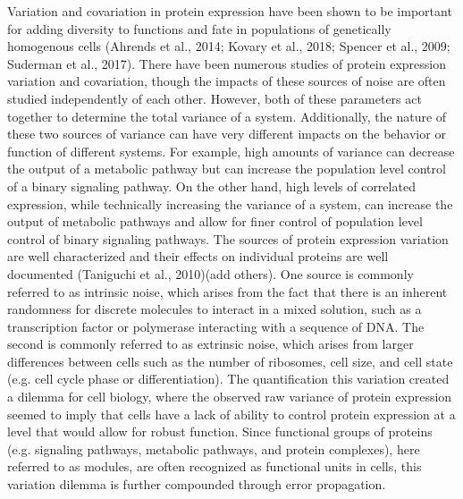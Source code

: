 Variation and covariation in protein expression have been shown to be important for adding diversity to functions and fate in populations of genetically homogenous cells (Ahrends et al., 2014; Kovary et al., 2018; Spencer et al., 2009; Suderman et al., 2017). There have been numerous studies of protein expression variation and covariation, though the impacts of these sources of noise are often studied independently of each other. However, both of these parameters act together to determine the total variance of a system. Additionally, the nature of these two sources of variance can have very different impacts on the behavior or function of different systems. For example, high amounts of variance can decrease the output of a metabolic pathway but can increase the population level control of a binary signaling pathway. On the other hand, high levels of correlated expression, while technically increasing the variance of a system, can increase the output of metabolic pathways and allow for finer control of population level control of binary signaling pathways. The sources of protein expression variation are well characterized and their effects on individual proteins are well documented (Taniguchi et al., 2010)(add others). One source is commonly referred to as intrinsic noise, which arises from the fact that there is an inherent randomness for discrete molecules to interact in a mixed solution, such as a transcription factor or polymerase interacting with a sequence of DNA. The second is commonly referred to as extrinsic noise, which arises from larger differences between cells such as the number of ribosomes, cell size, and cell state (e.g. cell cycle phase or differentiation). The quantification this variation created a dilemma for cell biology, where the observed raw variance of protein expression seemed to imply that cells have a lack of ability to control protein expression at a level that would allow for robust function. Since functional groups of proteins (e.g. signaling pathways, metabolic pathways, and protein complexes), here referred to as modules, are often recognized as functional units in cells, this variation dilemma is further compounded through error propagation. 

